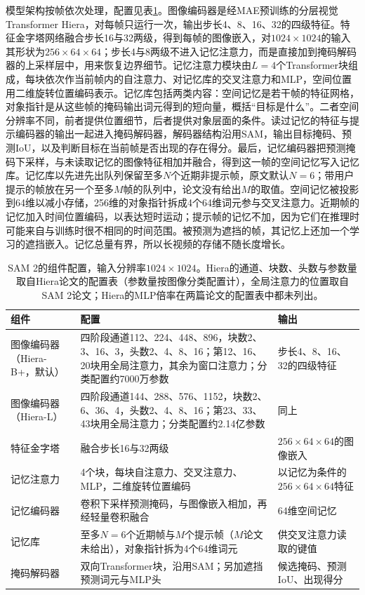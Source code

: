 模型架构按帧依次处理，配置见表\ref{tab:vision-video-sam2-config}。图像编码器是经MAE预训练的分层视觉Transformer Hiera，对每帧只运行一次，输出步长4、8、16、32的四级特征。特征金字塔网络融合步长16与32两级，得到每帧的图像嵌入，对$1024\times1024$的输入其形状为$256\times64\times64$；步长4与8两级不进入记忆注意力，而是直接加到掩码解码器的上采样层中，用来恢复边界细节。记忆注意力模块由$L=4$个Transformer块组成，每块依次作当前帧内的自注意力、对记忆库的交叉注意力和MLP，空间位置用二维旋转位置编码表示。记忆库包括两类内容：空间记忆是若干帧的特征网格，对象指针是从这些帧的掩码输出词元得到的短向量，概括“目标是什么”。二者空间分辨率不同，前者提供位置细节，后者提供对象层面的条件。读过记忆的特征与提示编码器的输出一起进入掩码解码器，解码器结构沿用SAM，输出目标掩码、预测IoU，以及判断目标在当前帧是否出现的存在得分。最后，记忆编码器把预测掩码下采样，与未读取记忆的图像特征相加并融合，得到这一帧的空间记忆写入记忆库。记忆库以先进先出队列保留至多$N$个近期非提示帧，原文默认$N=6$；带用户提示的帧放在另一个至多$M$帧的队列中，论文没有给出$M$的取值。空间记忆被投影到64维以减小存储，256维的对象指针拆成4个64维词元参与交叉注意力。近期帧的记忆加入时间位置编码，以表达短时运动；提示帧的记忆不加，因为它们在推理时可能来自与训练时很不相同的时间范围。被预测为遮挡的帧，其记忆上还加一个学习的遮挡嵌入。记忆总量有界，所以长视频的存储不随长度增长。

\begin{table}[tbp]
  \centering
  \small
  \begin{tabularx}{\linewidth}{@{}lXX@{}}
    \toprule
    组件 & 配置 & 输出\\
    \midrule
    图像编码器（Hiera-B+，默认） & 四阶段通道112、224、448、896，块数2、3、16、3，头数2、4、8、16；第12、16、20块用全局注意力，其余为窗口注意力；分类配置约7000万参数 & 步长4、8、16、32的四级特征\\
    图像编码器（Hiera-L） & 四阶段通道144、288、576、1152，块数2、6、36、4，头数2、4、8、16；第23、33、43块用全局注意力；分类配置约2.14亿参数 & 同上\\
    特征金字塔 & 融合步长16与32两级 & $256\times64\times64$的图像嵌入\\
    记忆注意力 & 4个块，每块自注意力、交叉注意力、MLP，二维旋转位置编码 & 以记忆为条件的$256\times64\times64$特征\\
    记忆编码器 & 卷积下采样预测掩码，与图像嵌入相加，再经轻量卷积融合 & 64维空间记忆\\
    记忆库 & 至多$N=6$个近期帧与$M$个提示帧（$M$论文未给出），对象指针拆为4个64维词元 & 供交叉注意力读取的键值\\
    掩码解码器 & 双向Transformer块，沿用SAM；另加遮挡预测词元与MLP头 & 候选掩码、预测IoU、出现得分\\
    \bottomrule
  \end{tabularx}
  \caption{SAM 2的组件配置，输入分辨率$1024\times1024$。Hiera的通道、块数、头数与参数量取自Hiera论文的配置表（参数量按图像分类配置计），全局注意力的位置取自SAM 2论文；Hiera的MLP倍率在两篇论文的配置表中都未列出。}
  \label{tab:vision-video-sam2-config}
\end{table}

